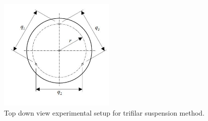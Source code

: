 \begin{figure}[H]
\centering
\includegraphics[width=0.5\textwidth]{chapters/lab1/m2topdown}
\caption{Top down view experimental setup for trifilar suspension method.}
\label{fig:mesh2}
\end{figure}
